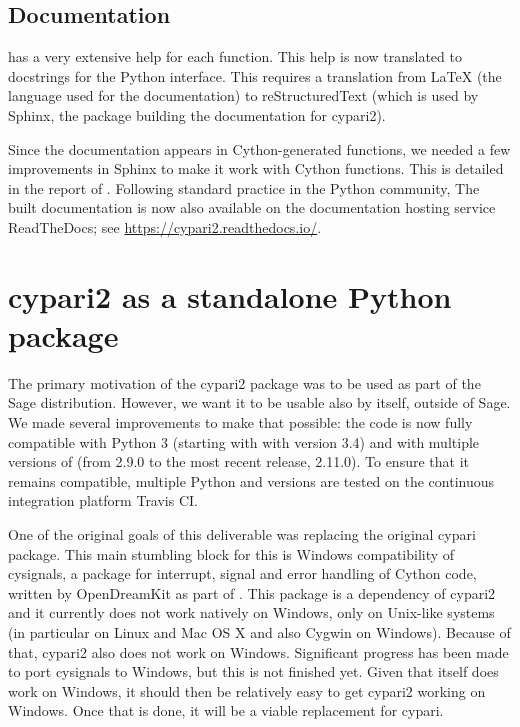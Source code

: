 \documentclass{deliverablereport}
\begin{document}
\subsection{Documentation}

\PariGP has a very extensive help for each function.
This help is now translated to docstrings for the Python interface.
This requires a translation from \LaTeX
(the language used for the \PariGP documentation)
to reStructuredText (which is used by Sphinx,
the package building the documentation for cypari2).

Since the documentation appears in Cython-generated functions,
we needed a few improvements in Sphinx to make it work
with Cython functions.
This is detailed in the report of .
Following standard practice in the Python community,
The built documentation is now also available on the
documentation hosting service ReadTheDocs;
see \url{https://cypari2.readthedocs.io/}.

\section{cypari2 as a standalone Python package}

The primary motivation of the cypari2 package
was to be used as part of the Sage distribution.
However, we want it to be usable also by itself, outside of Sage.
We made several improvements to make that possible:
the code is now fully compatible with Python 3 (starting with with version 3.4)
and with multiple versions of \PariGP (from 2.9.0 to the most recent release, 2.11.0).
To ensure that it remains compatible, multiple Python and \PariGP
versions are tested on the continuous integration platform Travis CI.

One of the original goals of this deliverable was replacing the original
cypari package.
This main stumbling block for this is Windows compatibility of cysignals,
a package for interrupt, signal and error handling
of Cython code, written by OpenDreamKit as part of .
This package is a dependency of cypari2 and it
currently does not work natively on Windows,
only on Unix-like systems
(in particular on Linux and Mac OS X and also Cygwin on Windows).
Because of that, cypari2 also does not work on Windows.
Significant progress has been made to port cysignals to Windows,
but this is not finished yet.
Given that \PariGP itself does work on Windows,
it should then be relatively easy to get cypari2 working on Windows.
Once that is done, it will be a viable replacement for cypari.

\end{document}
